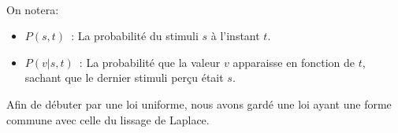 \paragraph{}
On notera:
\begin{itemize}
\item $P(s,t)$~: La probabilité du stimuli $s$ à l'instant $t$.
\item $P(v|s, t)$~: La probabilité que la valeur $v$ apparaisse en fonction
      de $t$, sachant que le dernier stimuli perçu était $s$.
\end{itemize}
Afin de débuter par une loi uniforme, nous avons gardé une loi ayant une
forme commune avec celle du lissage de Laplace.

